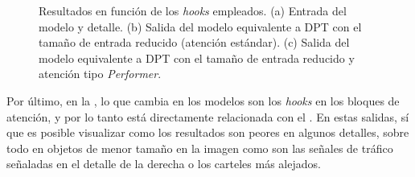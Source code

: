\begin{figure}[!ht]
\hspace{-3mm}
       
\caption{Resultados en función de los \textit{hooks} empleados. (a) Entrada del modelo y detalle. (b) Salida del modelo equivalente a DPT con el tamaño de entrada reducido (atención estándar). (c) Salida del modelo equivalente a DPT con el tamaño de entrada reducido y atención tipo \textit{Performer}.}
    \label{fig:cualitativa-5}
    \end{figure}
\captionsetup[subfigure]{labelformat=parens}

\pagebreak


Por último, en la , lo que cambia en los modelos son los \textit{hooks} en los bloques de atención, y por lo tanto está directamente relacionada con el . En estas salidas, sí que es posible visualizar como los resultados son peores en algunos detalles, sobre todo en objetos de menor tamaño en la imagen como son las señales de tráfico señaladas en el detalle de la derecha o los carteles más alejados.







